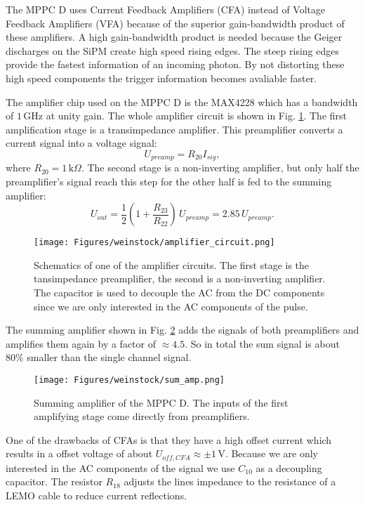 \documentclass[]{article}
\begin{document}
The MPPC D uses Current Feedback Amplifiers (CFA) instead of Voltage Feedback Amplifiers (VFA) because of the superior gain-bandwidth product of these amplifiers. A high 
gain-bandwidth product is needed because the Geiger discharges on the SiPM create high speed rising edges. The steep rising edges provide the fastest information of an incoming photon. 
By not distorting these high speed components the trigger information becomes avaliable faster.

The amplifier chip used on the MPPC D is the MAX4228 which has a bandwidth of $1\,\text{GHz}$ at unity gain. The whole amplifier circuit is shown in Fig. \ref{fig:amp_cir}. 
The first amplification stage is a transimpedance amplifier. This preamplifier converts a current signal into a voltage signal:
\begin{equation}
	U_{preamp} = R_{20} I_{sig},
\end{equation}
where $R_{20} = 1\,\text{k}\Omega$. The second stage is a non-inverting amplifier, but only half the preamplifier's signal reach this step for the other half is fed to the summing amplifier:
\begin{equation}
	U_{out} = \frac{1}{2} (1 + \frac{R_{23}}{R_{22}}) \, U_{preamp} = 2.85 \, U_{preamp}.
\end{equation}

	\begin{figure}[t]
		\centering
			\texttt{[image: Figures/weinstock/amplifier\_circuit.png]}
		\caption{Schematics of one of the amplifier circuits. The first stage is the tansimpedance preamplifier, the second is a non-inverting amplifier. The capacitor is used to decouple the AC from the DC components since we are only interested in the AC components of the pulse.}
		\label{fig:amp_cir}
	\end{figure}	
	
The summing amplifier shown in Fig. \ref{fig:sum_amp} adds the signals of both preamplifiers and amplifies them again by a factor of $\approx4.5$. So in total the sum signal is about $80\%$ smaller than the single channel signal.

	\begin{figure}[t]
		\centering
			\texttt{[image: Figures/weinstock/sum\_amp.png]}
		\caption{Summing amplifier of the MPPC D. The inputs of the first amplifying stage come directly from preamplifiers.}
		\label{fig:sum_amp}
	\end{figure}	
	
One of the drawbacks of CFAs is that they have a high offset current which results in a offset voltage of about $U_{off,CFA}\approx \pm 1\,\text{V}$. Because we are only interested in the AC components of the signal we use $C_{10}$ as a decoupling capacitor. The resistor $R_{18}$ adjusts the lines impedance to the resistance of a LEMO cable to reduce current reflections.
\end{document}
